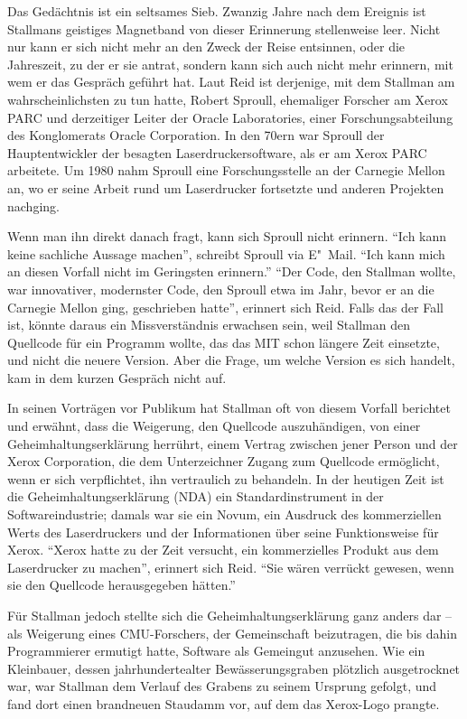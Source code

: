 Das Gedächtnis ist ein seltsames Sieb. Zwanzig Jahre nach dem Ereignis ist Stallmans geistiges Magnetband von dieser Erinnerung stellenweise leer. Nicht nur kann er sich nicht mehr an den Zweck der Reise entsinnen, oder die Jahreszeit, zu der er sie antrat, sondern kann sich auch nicht mehr erinnern, mit wem er das Gespräch geführt hat. Laut Reid ist derjenige, mit dem Stallman am wahrscheinlichsten zu tun hatte, Robert Sproull, ehemaliger Forscher am Xerox PARC und derzeitiger Leiter der Oracle Laboratories, einer Forschungsabteilung des Konglomerats Oracle Corporation. In den 70ern war Sproull der Hauptentwickler der besagten Laserdruckersoftware, als er am Xerox PARC arbeitete. Um 1980 nahm Sproull eine Forschungsstelle an der Carnegie Mellon an, wo er seine Arbeit rund um Laserdrucker fortsetzte und anderen Projekten nachging.

Wenn man ihn direkt danach fragt, kann sich Sproull nicht erinnern. "`Ich kann keine sachliche Aussage machen"', schreibt Sproull via E"~Mail. "`Ich kann mich an diesen Vorfall nicht im Geringsten erinnern."' "`Der Code, den Stallman wollte, war innovativer, modernster Code, den Sproull etwa im Jahr, bevor er an die Carnegie Mellon ging, geschrieben hatte"', erinnert sich Reid. Falls das der Fall ist, könnte daraus ein Missverständnis erwachsen sein, weil Stallman den Quellcode für ein Programm wollte, das das MIT schon längere Zeit einsetzte, und nicht die neuere Version. Aber die Frage, um welche Version es sich handelt, kam in dem kurzen Gespräch nicht auf.

In seinen Vorträgen vor Publikum hat Stallman oft von diesem Vorfall berichtet und erwähnt, dass die Weigerung, den Quellcode auszuhändigen, von einer Geheimhaltungserklärung herrührt, einem Vertrag zwischen jener Person und der Xerox Corporation, die dem Unterzeichner Zugang zum Quellcode ermöglicht, wenn er sich verpflichtet, ihn vertraulich zu behandeln. In der heutigen Zeit ist die Geheimhaltungserklärung (NDA) ein Standardinstrument in der Softwareindustrie; damals war sie ein Novum, ein Ausdruck des kommerziellen Werts des Laserdruckers und der Informationen über seine Funktionsweise für Xerox. "`Xerox hatte zu der Zeit versucht, ein kommerzielles Produkt aus dem Laserdrucker zu machen"', erinnert sich Reid. "`Sie wären verrückt gewesen, wenn sie den Quellcode herausgegeben hätten."'

Für Stallman jedoch stellte sich die Geheimhaltungserklärung ganz anders dar – als Weigerung eines CMU-Forschers, der Gemeinschaft beizutragen, die bis dahin Programmierer ermutigt hatte, Software als Gemeingut anzusehen. Wie ein Kleinbauer, dessen jahrhundertealter Bewässerungsgraben plötzlich ausgetrocknet war, war Stallman dem Verlauf des Grabens zu seinem Ursprung gefolgt, und fand dort einen brandneuen Staudamm vor, auf dem das Xerox-Logo prangte.

